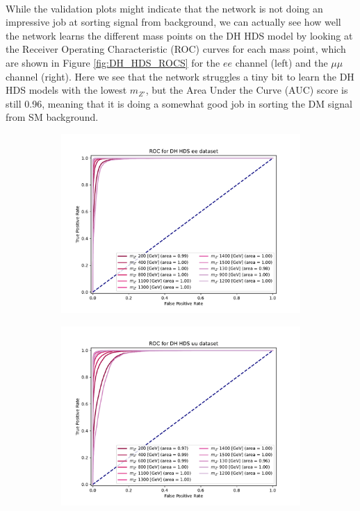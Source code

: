 \documentclass[12pt, a4paper]{book}
\begin{document}
\\While the validation plots might indicate that the network is not doing an impressive job at sorting signal from background, we can actually see how well the network learns the different mass points on the DH HDS model by looking at the Receiver Operating Characteristic (ROC) curves for each mass point, which are shown in Figure \ref{fig:DH_HDS_ROCS} for the $ee$ channel (left) and the $\mu\mu$ channel (right). 
Here we see that the network struggles a tiny bit to learn the DH HDS models with the lowest $m_{Z'}$, but the Area Under the Curve (AUC) score is still 0.96, meaning that it is doing a somewhat good job in sorting the DM signal from SM background.\\
\begin{figure}[!ht]
	\centering
	\begin{subfigure}[b]{0.49\textwidth}
      \centering
      \includegraphics[width=1\textwidth]{XGBoost/DH_HDS/ROC_ee.pdf}
      \end{subfigure}
   \hfill
   \begin{subfigure}[b]{0.49\textwidth}
      \centering
      \includegraphics[width=1\textwidth]{XGBoost/DH_HDS/ROC_uu.pdf}

\end{subfigure}
\end{figure}
\end{document}
